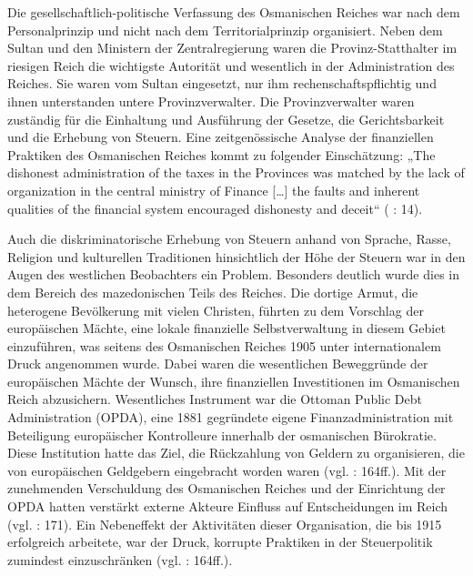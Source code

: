 Die gesellschaftlich-politische Verfassung des Osmanischen Reiches war nach dem Personalprinzip und nicht nach dem Territorialprinzip organisiert. Neben dem Sultan und den Ministern der Zentralregierung waren die Provinz-Statthalter im riesigen Reich die wichtigste Autorität und wesentlich in der Administration des Reiches. Sie waren vom Sultan eingesetzt, nur ihm rechenschaftspflichtig und ihnen unterstanden untere Provinzverwalter. Die Provinzverwalter waren zuständig für die Einhaltung und Ausführung der Gesetze, die Gerichtsbarkeit und die Erhebung von Steuern. Eine zeitgenössische Analyse der finanziellen Praktiken des Osmanischen Reiches kommt zu folgender Einschätzung: „The dishonest administration of the taxes in the Provinces was matched by the lack of organization in the central ministry of Finance […] the faults and inherent qualities of the financial system encouraged dishonesty and deceit“ (\cite{blaisd} : 14).\par
Auch die diskriminatorische Erhebung von Steuern anhand von Sprache, Rasse, Religion und kulturellen Traditionen hinsichtlich der Höhe der Steuern war in den Augen des westlichen Beobachters ein Problem. Besonders deutlich wurde dies in dem Bereich des mazedonischen Teils des Reiches. Die dortige Armut, die heterogene Bevölkerung mit vielen Christen, führten zu dem Vorschlag der europäischen Mächte, eine lokale finanzielle Selbstverwaltung in diesem Gebiet einzuführen, was seitens des Osmanischen Reiches 1905 unter internationalem Druck angenommen wurde. Dabei waren die wesentlichen Beweggründe der europäischen Mächte der Wunsch, ihre finanziellen Investitionen im Osmanischen Reich abzusichern. Wesentliches Instrument war die Ottoman Public Debt Administration (OPDA), eine 1881 gegründete eigene Finanzadministration mit Beteiligung europäischer Kontrolleure innerhalb der osmanischen Bürokratie. Diese Institution hatte das Ziel, die Rückzahlung von Geldern zu organisieren, die von europäischen Geldgebern eingebracht worden waren (vgl. \cite{blaisd} : 164ff.). Mit der zunehmenden Verschuldung des Osmanischen Reiches und der Einrichtung der OPDA hatten verstärkt externe Akteure Einfluss auf Entscheidungen im Reich (vgl. \cite{toepfer} : 171). Ein Nebeneffekt der Aktivitäten dieser Organisation, die bis 1915 erfolgreich arbeitete, war der Druck, korrupte Praktiken in der Steuerpolitik zumindest einzuschränken (vgl. \cite{blaisd} : 164ff.).\par

